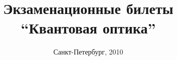 \title{Экзаменационные билеты \\ ``Квантовая оптика''}
\author{}
\date{Санкт-Петербург, 2010}
\maketitle
\newpage
